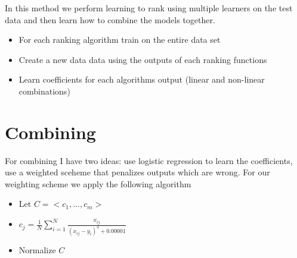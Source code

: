\documentclass{article}
\begin{document}
			In this method we perform learning to rank using multiple learners on the test data and then learn how to combine the models together. 

			\begin{itemize}
				\item For each ranking algorithm train on the entire data set
				\item Create a new data data using the outputs of each ranking functions
				\item Learn coefficients for each algorithms output (linear and non-linear combinations) 
			\end{itemize}

	\section{Combining}

		For combining I have two ideas: use logistic regression to learn the coefficients, use a weighted sceheme that penalizes outputs which are wrong.
		For our weighting scheme we apply the following algorithm
		
		\begin{itemize}
			\item  Let $C = <c_1,...,c_m>$
			\item  $c_j = \frac{1}{N} \sum_{i=1}^{N} \frac{x_{ij}}{({x_{ij}} - y_i)^2 + 0.00001}$
			\item  Normalize $C$
		\end{itemize}	
\end{document}
